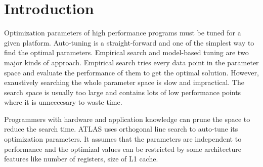 \section{Introduction}
\label{sec:intro}

Optimization parameters of high performance programs must be tuned for a given platform. 
Auto-tuning is a straight-forward and one of the simplest way to find the optimal parameters.
Empirical search and model-based tuning are two major kinds of approach. 
Empirical search tries every data point in the parameter space and evaluate the performance of
them to get the optimal solution. 
However, exaustively searching the whole parameter space is slow and impractical. 
The search space is usually too large and contains lots of low performance points where
it is unneccesary to waste time. 
\par
Programmers with hardware and application knowledge can prune the space to reduce the search time.
ATLAS uses orthogonal line search to auto-tune its optimization parameters. 
It assumes that the parameters are independent to performance and the optimizal values can be 
restricted by some architecture features like number of registers, size of L1 cache. 



